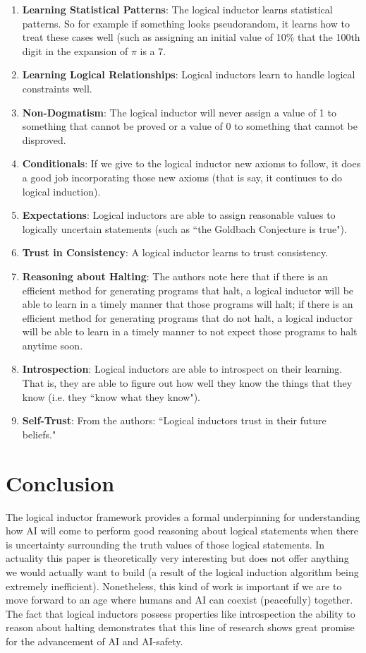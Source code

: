 \documentclass{article}
\begin{document}
\begin{enumerate}
\item \textbf{Learning Statistical Patterns}:
The logical inductor learns statistical patterns. So for example if something looks pseudorandom, it learns how to treat these cases well (such as assigning an initial value of 10\% that the 100th digit in the expansion of $\pi$ is a 7.
\item \textbf{Learning Logical Relationships}:
Logical inductors learn to handle logical constraints well.
\item \textbf{Non-Dogmatism}:
The logical inductor will never assign a value of 1 to something that cannot be proved or a value of 0 to something that cannot be disproved.
\item \textbf{Conditionals}:
If we give to the logical inductor new axioms to follow, it does a good job incorporating those new axioms (that is say, it continues to do logical induction).
\item \textbf{Expectations}:
Logical inductors are able to assign reasonable values to logically uncertain statements (such as ``the Goldbach Conjecture is true").
\item \textbf{Trust in Consistency}:
A logical inductor learns to trust consistency.
\item \textbf{Reasoning about Halting}:
The authors note here that if there is an efficient method for generating programs that halt, a logical inductor will be able to learn in a timely manner that those programs will halt; if there is an efficient method for generating programs that do not halt, a logical inductor will be able to learn in a timely manner to not expect those programs to halt anytime soon.
\item \textbf{Introspection}:
Logical inductors are able to introspect on their learning. That is, they are able to figure out how well they know the things that they know (i.e. they ``know what they know").

\item \textbf{Self-Trust}:
From the authors: ``Logical inductors trust in their future beliefs."
\end{enumerate} 


\section{Conclusion}
The logical inductor framework provides a formal underpinning for understanding how AI will come to perform good reasoning about logical statements when there is uncertainty surrounding the truth values of those logical statements. In actuality this paper is theoretically very interesting but does not offer anything we would actually want to build (a result of the logical induction algorithm being extremely inefficient). Nonetheless, this kind of work is important if we are to move forward to an age where humans and AI can coexist (peacefully) together. The fact that logical inductors possess properties like introspection the ability to reason about halting demonstrates that this line of research shows great promise for the advancement of AI and AI-safety.
\end{document}
